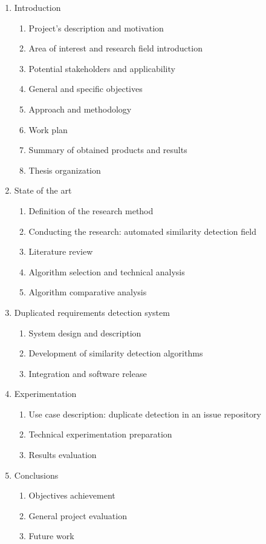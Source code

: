 \documentclass[11pt]{article}
\begin{document}
\begin{enumerate}
\item Introduction
\begin{enumerate}
\item Project's description and motivation
\item Area of interest and research field introduction
\item Potential stakeholders and applicability
\item General and specific objectives
\item Approach and methodology
\item Work plan
\item Summary of obtained products and results
\item Thesis organization
\end{enumerate}
\item State of the art
\begin{enumerate}
\item Definition of the research method
\item Conducting the research: automated similarity detection field
\item Literature review
\item Algorithm selection and technical analysis
\item Algorithm comparative analysis
\end{enumerate}
\item Duplicated requirements detection system
\begin{enumerate}
\item System design and description
\item Development of similarity detection algorithms
\item Integration and software release
\end{enumerate}
\item Experimentation
\begin{enumerate}
\item Use case description: duplicate detection in an issue repository
\item Technical experimentation preparation
\item Results evaluation
\end{enumerate}
\item Conclusions
\begin{enumerate}
\item Objectives achievement
\item General project evaluation
\item Future work
\end{enumerate}
\end{enumerate}
\end{document}
